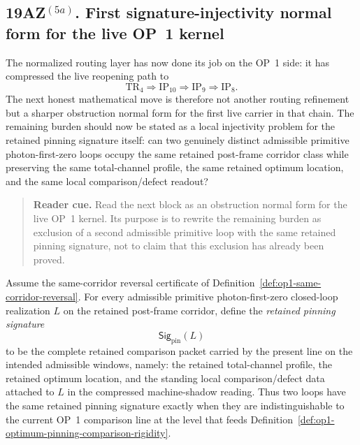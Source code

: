 \subsection*{19AZ$^{(5a)}$. First signature-injectivity normal form for the live OP~1 kernel}
\label{sec:first-signature-injectivity-normal-form-live-op1-kernel}
The normalized routing layer has now done its job on the OP~1 side: it has compressed the live reopening path to
\[
\mathrm{TR}_4 \Longrightarrow \mathrm{IP}_{10} \Longrightarrow \mathrm{IP}_9 \Longrightarrow \mathrm{IP}_8.
\]
The next honest mathematical move is therefore not another routing refinement but a sharper obstruction normal form for the first live carrier in that chain. The remaining burden should now be stated as a local injectivity problem for the retained pinning signature itself: can two genuinely distinct admissible primitive photon-first-zero loops occupy the same retained post-frame corridor class while preserving the same total-channel profile, the same retained optimum location, and the same local comparison/defect readout?

\begin{quote}\small
\noindent\textbf{Reader cue.} Read the next block as an obstruction normal form for the live OP~1 kernel. Its purpose is to rewrite the remaining burden as exclusion of a second admissible primitive loop with the same retained pinning signature, not to claim that this exclusion has already been proved.
\end{quote}

\begin{definition}
\label{def:retained-pinning-signature-op1-corridor}
Assume the same-corridor reversal certificate of Definition~\ref{def:op1-same-corridor-reversal}. For every admissible primitive photon-first-zero closed-loop realization $L$ on the retained post-frame corridor, define the \emph{retained pinning signature}
\[
\mathsf{Sig}_{\mathrm{pin}}(L)
\]
to be the complete retained comparison packet carried by the present line on the intended admissible windows, namely: the retained total-channel profile, the retained optimum location, and the standing local comparison/defect data attached to $L$ in the compressed machine-shadow reading. Thus two loops have the same retained pinning signature exactly when they are indistinguishable to the current OP~1 comparison line at the level that feeds Definition~\ref{def:op1-optimum-pinning-comparison-rigidity}.
\end{definition}

